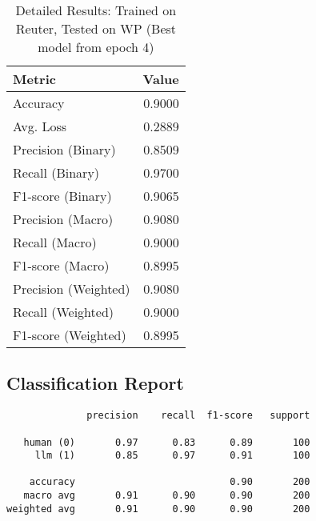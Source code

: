 \documentclass{article}
\begin{document}
\begin{table}[htbp]
\centering
\caption*{Detailed Results: Trained on Reuter, Tested on WP (Best model from epoch 4)}
\begin{tabular}{@{}lr@{}}
\toprule
Metric & Value \\
\midrule
Accuracy & 0.9000 \\
Avg. Loss & 0.2889 \\
Precision (Binary) & 0.8509 \\
Recall (Binary) & 0.9700 \\
F1-score (Binary) & 0.9065 \\
Precision (Macro) & 0.9080 \\
Recall (Macro) & 0.9000 \\
F1-score (Macro) & 0.8995 \\
Precision (Weighted) & 0.9080 \\
Recall (Weighted) & 0.9000 \\
F1-score (Weighted) & 0.8995 \\
\bottomrule
\end{tabular}
\subsection*{Classification Report}
\begin{verbatim}
              precision    recall  f1-score   support

   human (0)       0.97      0.83      0.89       100
     llm (1)       0.85      0.97      0.91       100

    accuracy                           0.90       200
   macro avg       0.91      0.90      0.90       200
weighted avg       0.91      0.90      0.90       200
\end{verbatim}
\end{table}
\end{document}
